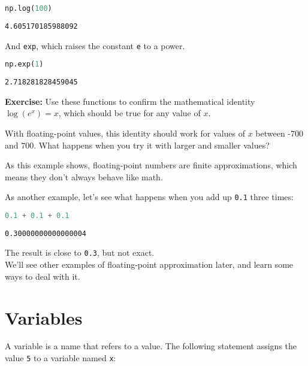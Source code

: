 \begin{lstlisting}[language=Python,style=source]
np.log(100)
\end{lstlisting}

\begin{lstlisting}[style=output]
4.605170185988092
\end{lstlisting}

And \passthrough{\lstinline!exp!}, which raises the constant
\passthrough{\lstinline!e!} to a power.

\begin{lstlisting}[language=Python,style=source]
np.exp(1)
\end{lstlisting}

\begin{lstlisting}[style=output]
2.718281828459045
\end{lstlisting}

\textbf{Exercise:} Use these functions to confirm the mathematical
identity \(\log(e^x) = x\), which should be true for any value of \(x\).

With floating-point values, this identity should work for values of
\(x\) between -700 and 700. What happens when you try it with larger and
smaller values?

As this example shows, floating-point numbers are finite approximations,
which means they don't always behave like math.

As another example, let's see what happens when you add up
\passthrough{\lstinline!0.1!} three times:

\begin{lstlisting}[language=Python,style=source]
0.1 + 0.1 + 0.1
\end{lstlisting}

\begin{lstlisting}[style=output]
0.30000000000000004
\end{lstlisting}

The result is close to \passthrough{\lstinline!0.3!}, but not exact.\\
We'll see other examples of floating-point approximation later, and
learn some ways to deal with it.

\hypertarget{variables}{%
\section{Variables}\label{variables}}

A variable is a name that refers to a value. The following statement
assigns the value \passthrough{\lstinline!5!} to a variable named
\passthrough{\lstinline!x!}:

